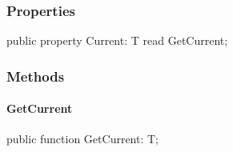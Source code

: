 \documentclass{report}
\newif\ifpdf
\begin{document}
\subsubsection*{\large{\textbf{Properties}}\normalsize\hspace{1ex}\hfill}
\begin{list}{}{
\setlength{\itemindent}{0cm}
\setlength{\listparindent}{0cm}
\setlength{\leftmargin}{\evensidemargin}
\addtolength{\leftmargin}{\tmplength}
\settowidth{\labelsep}{X}
\addtolength{\leftmargin}{\labelsep}
\setlength{\labelwidth}{\tmplength}
}
\label{ok_attributes.IEnumerator-Current}
\item[\textbf{Current}\hfill]
\ifpdf
\begin{flushleft}
\fi
\begin{ttfamily}
public property Current: T read GetCurrent;\end{ttfamily}

\ifpdf
\end{flushleft}
\fi


\par  \end{list}
\subsubsection*{\large{\textbf{Methods}}\normalsize\hspace{1ex}\hfill}
\paragraph*{GetCurrent}\hspace*{\fill}

\label{ok_attributes.IEnumerator-GetCurrent}
\begin{list}{}{
\setlength{\itemindent}{0cm}
\setlength{\listparindent}{0cm}
\setlength{\leftmargin}{\evensidemargin}
\addtolength{\leftmargin}{\tmplength}
\settowidth{\labelsep}{X}
\addtolength{\leftmargin}{\labelsep}
\setlength{\labelwidth}{\tmplength}
}
\item[\textbf{Declaration}\hfill]
\ifpdf
\begin{flushleft}
\fi
\begin{ttfamily}
public function GetCurrent: T;\end{ttfamily}

\ifpdf
\end{flushleft}
\fi

\end{list}
\ifpdf
\end{document}
